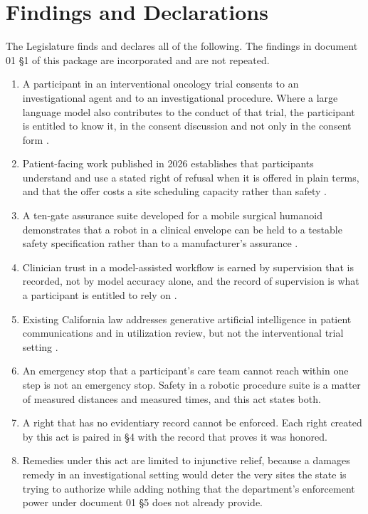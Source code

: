 
\section{Findings and Declarations}

The Legislature finds and declares all of the following. The findings in
document 01 §1 of this package are incorporated and are not repeated.

\begin{enumerate}
\item A participant in an interventional oncology trial consents to an
  investigational agent and to an investigational procedure. Where a large
  language model also contributes to the conduct of that trial, the participant
  is entitled to know it, in the consent discussion and not only in the consent
  form \cite{cfr50adapt}.

\item Patient-facing work published in 2026 establishes that participants
  understand and use a stated right of refusal when it is offered in plain
  terms, and that the offer costs a site scheduling capacity rather than safety
  \cite{patientadvocacy,patientinstructions2026}.

\item A ten-gate assurance suite developed for a mobile surgical humanoid
  demonstrates that a robot in a clinical envelope can be held to a testable
  safety specification rather than to a manufacturer's assurance
  \cite{h2humanoid}.

\item Clinician trust in a model-assisted workflow is earned by supervision that
  is recorded, not by model accuracy alone, and the record of supervision is
  what a participant is entitled to rely on \cite{cliniciantrust}.

\item Existing California law addresses generative artificial intelligence in
  patient communications and in utilization review, but not the interventional
  trial setting \cite{ab3030_2024,sb1120_2024}.

\item An emergency stop that a participant's care team cannot reach within one
  step is not an emergency stop. Safety in a robotic procedure suite is a matter
  of measured distances and measured times, and this act states both.

\item A right that has no evidentiary record cannot be enforced. Each right
  created by this act is paired in §4 with the record that proves it was
  honored.

\item Remedies under this act are limited to injunctive relief, because a
  damages remedy in an investigational setting would deter the very sites the
  state is trying to authorize while adding nothing that the department's
  enforcement power under document 01 §5 does not already provide.
\end{enumerate}

